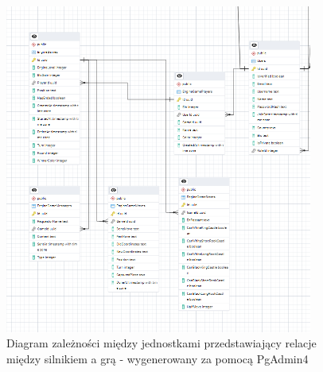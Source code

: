 \documentclass[12pt,a4paper]{article}
\begin{document}
\vspace{1cm}
\begin{figure}[h!]
    \centering
    \includegraphics[width=0.9\textwidth]{images/ERD_offline.png}
    \caption{Diagram zależności między jednostkami przedstawiający relacje między silnikiem a grą - wygenerowany za pomocą PgAdmin4}
\end{figure}

\newpage
\end{document}
